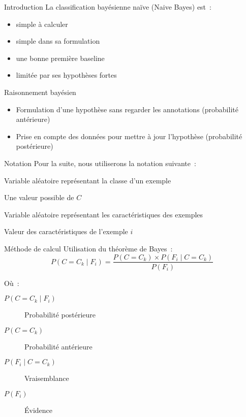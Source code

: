 \begin{frame}{Introduction}
  La classification bayésienne naïve (Naive Bayes) est~:
  \begin{itemize}[<+(1)->]
    \item simple à calculer
    \item simple dans sa formulation
    \item une bonne première baseline
    \item limitée par ses hypothèses fortes
  \end{itemize}
\end{frame}

\begin{frame}{Raisonnement bayésien}
  \begin{itemize}
    \item Formulation d'une hypothèse sans regarder les annotations (probabilité antérieure)
    \item Prise en compte des données pour mettre à jour l'hypothèse (probabilité postérieure)
  \end{itemize}
\end{frame}

\begin{frame}{Notation}
  Pour la suite, nous utiliserons la notation suivante~:

  \begin{description}[<+(1)->]
    \item[$C$] Variable aléatoire représentant la classe d'un exemple
    \item[$C_k$] Une valeur possible de $C$
    \item[$F$] Variable aléatoire représentant les caractéristiques des exemples
    \item[$F_i$] Valeur des caractéristiques de l'exemple $i$
  \end{description}
\end{frame}

\begin{frame}{Méthode de calcul}
  Utilisation du théorème de Bayes~:
  \[
    P(C = C_k \mid F_i) = \frac{P(C = C_k) \times P(F_i \mid C = C_k)}{P(F_i)}
  \]

  Où~:

  \begin{description}
    \item[$P(C = C_k \mid F_i)$] Probabilité postérieure
    \item[$P(C = C_k)$] Probabilité antérieure
    \item[$P(F_i \mid C = C_k)$] Vraisemblance
    \item[$P(F_i)$] Évidence
  \end{description}
\end{frame}

